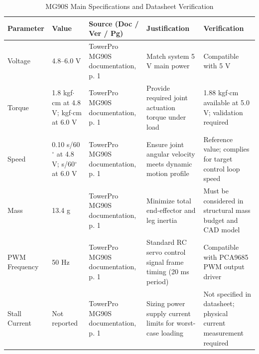 \documentclass[lettersize,journal]{IEEEtran}
\begin{document}
	\begin{table}[!t]
		\centering
		\caption{MG90S Main Specifications and Datasheet Verification \cite{mg90s}}
		\label{tab:mg90s_specs}
		\scriptsize
		
		\setlength{\tabcolsep}{2pt}
		\renewcommand{\arraystretch}{1.1}
		
		\begin{tabularx}{\columnwidth}{@{}P{1.5cm} P{1.7cm} P{2.cm} P{1.5cm} X@{}}
			\toprule
			\textbf{Parameter} & \textbf{Value} & \textbf{Source (Doc / Ver / Pg)} & \textbf{Justification} & \textbf{Verification} \\
			\midrule
			
			Voltage & 
			4.8--6.0 V & 
			TowerPro MG90S documentation, p. 1 & 
			Match system 5 V main power & 
			Compatible with 5 V \\
			
			Torque & 
			1.8 kgf$\cdot$cm at 4.8 V;  kgf$\cdot$cm at 6.0 V & 
			TowerPro MG90S documentation, p. 1 & 
			Provide required joint actuation torque under load & 
			1.88 kgf$\cdot$cm available at 5.0 V; validation required \\
			
			Speed & 
			0.10 s/60$^\circ$ at 4.8 V;  s/60$^\circ$ at 6.0 V & 
			TowerPro MG90S documentation, p. 1 & 
			Ensure joint angular velocity meets dynamic motion profile & 
			Reference value; complies for target control loop speed \\
			
			Mass & 
			13.4 g & 
			TowerPro MG90S documentation, p. 1 & 
			Minimize total end-effector and leg inertia & 
			Must be considered in structural mass budget and CAD model \\
			
			PWM Frequency & 
			50 Hz & 
			TowerPro MG90S documentation, p. 1 & 
			Standard RC servo control signal frame timing (20 ms period) & 
			Compatible with PCA9685 PWM output driver \\
			
			Stall Current & 
			Not reported & 
			TowerPro MG90S documentation, p. 1 & 
			Sizing power supply current limits for worst-case loading & 
			Not specified in datasheet; physical current measurement required \\
			
			\bottomrule
		\end{tabularx}
	\end{table}
	
\end{document}
